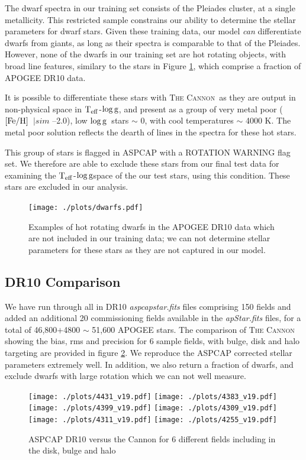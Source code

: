 \documentclass[12pt, preprint]{aastex}
\newcommand{\teff}{\mbox{$\rm T_{eff}$}}
\newcommand{\feh}{\mbox{$\rm [Fe/H]$}}
\newcommand{\logg}{\mbox{$\rm \log g$}}
\newcommand{\tc}{\textsc{The Cannon}}
\begin{document}
The dwarf spectra in our training set consists of the Pleiades cluster, at a single metallicity. This restricted sample constrains our ability to determine the stellar parameters for dwarf stars. Given these training data, our model \textit{can} differentiate dwarfs from giants, as long as their spectra is comparable to that of the Pleiades. However, none of the dwarfs in our training set are hot rotating objects, with broad line features, similary to the stars in Figure \ref{fig:dwarfs}, which comprise a fraction of APOGEE DR10 data. 

It is possible to differentiate these stars with \tc\, as they are output in non-physical space in \teff-\logg, and present as a group of very metal poor (\feh\ $|sim$ --2.0), low \logg\ stars $\sim$ 0, with cool temperatures $\sim$ 4000 K. The metal poor solution reflects the dearth of lines in the spectra for these hot stars. 

This group of stars is flagged in ASPCAP with a ROTATION WARNING flag set. We therefore are able to exclude these stars from our final test data for examining the \teff-\logg space of the our test stars, using this condition. These stars are excluded in our analysis.
 
 \begin{figure}[h]
 \texttt{[image: ./plots/dwarfs.pdf]}
  \caption{Examples of hot rotating dwarfs in the APOGEE DR10 data which are not included in our training data; we can not determine stellar parameters for these stars as they are not captured in our model.}
\label{fig:dwarfs}
\end{figure}

\subsection{DR10 Comparison}
 
We have run through all in DR10 \textit{aspcapstar.fits} files comprising 150 fields and added an additional 20 commissioning fields available in the \textit{apStar.fits} files, for a total of 46,800$+$4800 $\sim$ 51,600 APOGEE stars. The comparison of \tc\, showing the bias, rms and precision for 6 sample fields, with bulge, disk and halo targeting are provided in figure \ref{fig:cal}. We reproduce the ASPCAP corrected stellar parameters extremely well. In addition, we also return a fraction of dwarfs, and exclude dwarfs with large rotation which we can not well measure. 

\begin{figure}[h!]
\centering
  \texttt{[image: ./plots/4431\_v19.pdf]}
    \texttt{[image: ./plots/4383\_v19.pdf]} \\
      \texttt{[image: ./plots/4399\_v19.pdf]}
        \texttt{[image: ./plots/4309\_v19.pdf]} \\
              \texttt{[image: ./plots/4311\_v19.pdf]}
        \texttt{[image: ./plots/4255\_v19.pdf]} \\
\caption{\small{ASPCAP DR10 versus the Cannon for 6 different fields including in the disk, bulge and halo}}
\label{fig:cal}
\end{figure}
\end{document}
